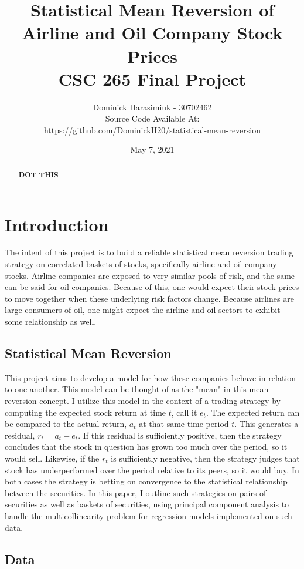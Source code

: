 \documentclass{article}
\title{Statistical Mean Reversion of \\
Airline and Oil Company Stock Prices \\
\large CSC 265 Final Project}
\author{Dominick Harasimiuk - 30702462\\
Source Code Available At:\\ 
https://github.com/DominickH20/statistical-mean-reversion}
\date{May 7, 2021}
\begin{document}
\maketitle

\vspace{1cm}

\begin{abstract}
\noindent
\textbf{DOT THIS}
\lipsum[1]
\end{abstract}

\newpage
\section{Introduction}
The intent of this project is to build a reliable statistical mean reversion trading strategy
on correlated baskets of stocks, specifically airline and oil company stocks. Airline companies
are exposed to very similar pools of risk, and the same can be said for oil companies. Because
of this, one would expect their stock prices to move together when these underlying risk
factors change. Because airlines are large consumers of oil, one might expect the airline and
oil sectors to exhibit some relationship as well.
\subsection{Statistical Mean Reversion}
This project aims to develop a model for how these companies behave in relation
to one another. This model can be thought of as the "mean" in this mean reversion concept. I
utilize this model in the context of a trading strategy by computing the expected stock return 
at time $t$, call it $e_t$. The expected return can be compared to the actual return, $a_t$
at that same time period $t$. This generates a residual, $r_t = a_t - e_t$. If this residual
is sufficiently positive, then the strategy concludes that the stock in question has grown too 
much over the period, so it would sell. Likewise, if the $r_t$ is sufficiently negative, then the 
strategy judges that stock has underperformed over the period relative to its peers, so it would buy. In both cases
the strategy is betting on convergence to the statistical relationship between the securities.
In this paper, I outline such strategies on pairs of securities as well as baskets of securities,
using principal component analysis to handle the multicollinearity problem for regression
models implemented on such data.

\subsection{Data}
\end{document}
